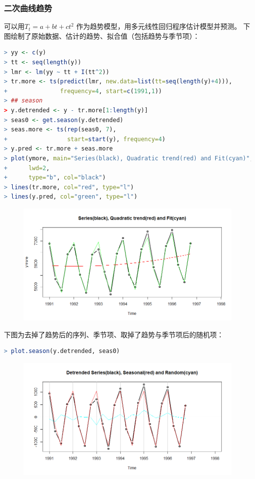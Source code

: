 \documentclass[11pt,a4paper,oneside]{book}
\begin{document}
\subsubsection{二次曲线趋势}
可以用$ T_t = a+bt+ct^2 $ 作为趋势模型，用多元线性回归程序估计模型并预测。
下图绘制了原始数据、估计的趋势、拟合值（包括趋势与季节项）：
\begin{lstlisting}[language=r]
> yy <- c(y)
> tt <- seq(length(y))
> lmr <- lm(yy ~ tt + I(tt^2))
> tr.more <- ts(predict(lmr, new.data=list(tt=seq(length(y)+4))),
+               frequency=4, start=c(1991,1))
> ## season
> y.detrended <- y - tr.more[1:length(y)]
> seas0 <- get.season(y.detrended)
> seas.more <- ts(rep(seas0, 7),
+                 start=start(y), frequency=4)
> y.pred <- tr.more + seas.more
> plot(ymore, main="Series(black), Quadratic trend(red) and Fit(cyan)",
+      lwd=2,
+      type="b", col="black")
> lines(tr.more, col="red", type="l")
> lines(y.pred, col="green", type="l")
\end{lstlisting}
\begin{figure}[H]
	\centering
	\includegraphics[width=\textwidth]{7.png}
\end{figure}
下图为去掉了趋势后的序列、季节项、取掉了趋势与季节项后的随机项：
\begin{lstlisting}[language=r]
> plot.season(y.detrended, seas0)
\end{lstlisting}
\begin{figure}[H]
	\centering
	\includegraphics[width=\textwidth]{8.png}
\end{figure}
\end{document}
